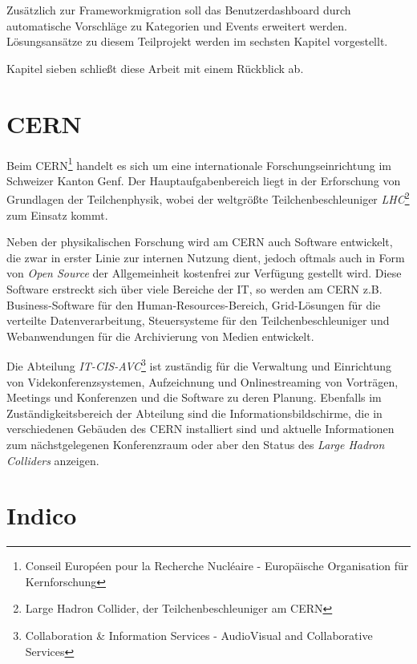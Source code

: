 Zusätzlich zur Frameworkmigration soll das Benutzerdashboard durch automatische Vorschläge zu
Kategorien und Events erweitert werden. Lösungsansätze zu diesem Teilprojekt werden im sechsten
Kapitel vorgestellt.

Kapitel sieben schließt diese Arbeit mit einem Rückblick ab.


\section{CERN}

Beim CERN\footnote{Conseil Européen pour la Recherche Nucléaire - Europäische Organisation für
Kernforschung} handelt es sich um eine internationale Forschungseinrichtung im Schweizer Kanton
Genf. Der Hauptaufgabenbereich liegt in der Erforschung von Grundlagen der Teilchenphysik, wobei der
weltgrößte Teilchenbeschleuniger \emph{LHC}\footnote{Large Hadron Collider, der
Teilchenbeschleuniger am CERN} zum Einsatz kommt.

Neben der physikalischen Forschung wird am CERN auch Software entwickelt, die zwar in erster
Linie zur internen Nutzung dient, jedoch oftmals auch in Form von \emph{Open Source} der
Allgemeinheit kostenfrei zur Verfügung gestellt wird. Diese Software erstreckt sich über viele
Bereiche der IT, so werden am CERN z.B. Business-Software für den Human-Resources-Bereich,
Grid-Lösungen für die verteilte Datenverarbeitung, Steuersysteme für den Teilchenbeschleuniger und
Webanwendungen für die Archivierung von Medien entwickelt.

Die Abteilung \emph{IT-CIS-AVC}\footnote{Collaboration \& Information Services - AudioVisual and
Collaborative Services} ist zuständig für die Verwaltung und Einrichtung von Videkonferenzsystemen,
Aufzeichnung und Onlinestreaming von Vorträgen, Meetings und Konferenzen und die Software zu deren
Planung. Ebenfalls im Zuständigkeitsbereich der Abteilung sind die Informationsbildschirme, die in
verschiedenen Gebäuden des CERN installiert sind und aktuelle Informationen zum nächstgelegenen
Konferenzraum oder aber den Status des \emph{Large Hadron Colliders} anzeigen.


\section{Indico}

